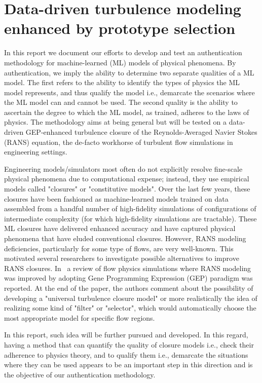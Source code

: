\chapter{Data-driven turbulence modeling enhanced by prototype selection}
%
In this report we document our efforts to develop and test an authentication methodology for
machine-learned (ML) models of physical phenomena. By authentication, we imply the ability to
determine two separate qualities of a ML model. The ﬁrst refers to the ability to identify the types of
physics the ML model represents, and thus qualify the model i.e., demarcate the scenarios where the ML
model can and cannot be used. The second quality is the ability to ascertain the degree to which the ML
model, as trained, adheres to the laws of physics. The methodology aims at being general but will be tested on a data-driven GEP-enhanced turbulence closure of the Reynolds-Averaged Navier Stokes (RANS) equation, the de-facto workhorse of turbulent ﬂow simulations in engineering settings.

Engineering models/simulators most often do not explicitly resolve ﬁne-scale physical phenomena due to
computational expense; instead, they use empirical models called "closures" or "constitutive
models". Over the last few years, these closures have been fashioned as machine-learned models trained on data assembled from a handful number of high-ﬁdelity simulations of conﬁgurations of intermediate
complexity (for which high-ﬁdelity simulations are tractable). These ML closures have delivered
enhanced accuracy and have captured physical phenomena that have eluded conventional closures. However, RANS modeling deficiencies, particularly for some type of flows, are very well-known. 
This motivated several researchers to investigate possible alternatives to improve RANS closures. In~\cite{Sandberg2022} a review of flow physics simulations where RANS modeling was improved by adopting Gene Programming Expression (GEP) paradigm was reported. At the end of the paper, the authors comment about the possibility of developing a "universal turbulence closure model"  or more realistically the idea of realizing some kind of "filter" or "selector", which would automatically choose the most appropriate model for specific flow regions.

In this report, such idea will be further pursued and developed. In this regard, having a method that can quantify the quality of closure models i.e., check their adherence to physics theory, and to qualify them i.e., demarcate the situations where they can be used appears to be an important step in this direction and is the objective of our authentication methodology.

